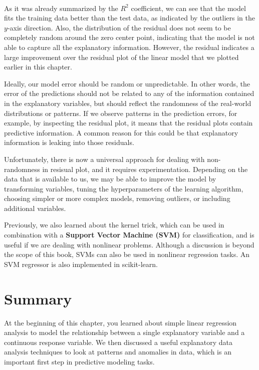 \documentclass[11pt]{article}
\begin{document}
    \begin{center}
    \end{center}
    { \hspace*{\fill} \\}
    
    As it was already summarized by the \(R^2\) coefficient, we can see that
the model fits the training data better than the test data, as indicated
by the outliers in the \(y\)-axis direction. Also, the distribution of
the residual does not seem to be completely random around the zero
center point, indicating that the model is not able to capture all the
explanatory information. However, the residual indicates a large
improvement over the residual plot of the linear model that we plotted
earlier in this chapter.

Ideally, our model error should be random or unpredictable. In other
words, the error of the predictions should not be related to any of the
information contained in the explanatory variables, but should reflect
the randomness of the real-world distributions or patterns. If we
observe patterns in the prediction errors, for example, by inspecting
the residual plot, it means that the residual plots contain predictive
information. A common reason for this could be that explanatory
information is leaking into those residuals.

Unfortunately, there is now a universal approach for dealing with
non-randomness in resisual plot, and it requires experimentation.
Depending on the data that is available to us, we may be able to improve
the model by transforming variables, tuning the hyperparameters of the
learning algorithm, choosing simpler or more complex models, removing
outliers, or including additional variables.

    Previously, we also learned about the kernel trick, which can be used in
combination with a \textbf{Support Vector Machine (SVM)} for
classification, and is useful if we are dealing with nonlinear problems.
Although a discussion is beyond the scope of this book, SVMs can also be
used in nonlinear regression tasks. An SVM regressor is also implemented
in scikit-learn.

    \section{Summary}\label{summary}

    At the beginning of this chapter, you learned about simple linear
regression analysis to model the relationship between a single
explanatory variable and a continuous response variable. We then
discussed a useful explanatory data analysis techniques to look at
patterns and anomalies in data, which is an important first step in
predictive modeling tasks.
\end{document}
